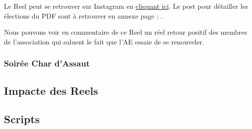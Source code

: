 Le Reel peut se retrouver sur Instagram en \href{https://www.instagram.com/reel/CxQtgEXMqon/?utm_source=ig_web_copy_link&igshid=MzRlODBiNWFlZA==}{cliquant ici}.
Le post pour détailler les élections du \gls{PDF} sont à retrouver en annexe page : \pageref{subsec:interface-instagram}.

Nous pouvons voir en commentaire de ce Reel un réel retour positif des membres de l'association qui saluent le fait que l'\gls{AE} essaie de se renouveler.

\subsubsection{Soirée Char d'Assaut}


\subsection{Impacte des Reels}\label{subsec:impacte-des-reels}

\subsection{Scripts}\label{subsec:scripts}

\begin{dialogue}
     \lipsum[1]
     \lipsum[2]
\end{dialogue}
